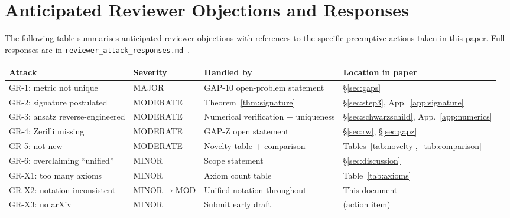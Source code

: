 \documentclass[12pt,a4paper]{article}
\theoremstyle{definition}
\theoremstyle{remark}
\begin{document}
\section{Anticipated Reviewer Objections and Responses}
\label{app:reviewer}

The following table summarises anticipated reviewer objections with references
to the specific preemptive actions taken in this paper.
Full responses are in \texttt{reviewer\_attack\_responses.md}~\cite{jaros2026_canonical}.

\begin{center}
\small
\begin{tabular}{llll}
\toprule
\textbf{Attack} & \textbf{Severity} & \textbf{Handled by} & \textbf{Location in paper} \\
\midrule
GR-1: metric not unique & MAJOR
  & GAP-10 open-problem statement
  & \S\ref{sec:gaps} \\
GR-2: signature postulated & MODERATE
  & Theorem~\ref{thm:signature}
  & \S\ref{sec:step3}, App.~\ref{app:signature} \\
GR-3: ansatz reverse-engineered & MODERATE
  & Numerical verification + uniqueness
  & \S\ref{sec:schwarzschild}, App.~\ref{app:numerics} \\
GR-4: Zerilli missing & MODERATE
  & GAP-Z open statement
  & \S\ref{sec:rw}, \S\ref{sec:gapz} \\
GR-5: not new & MODERATE
  & Novelty table + comparison
  & Tables~\ref{tab:novelty},~\ref{tab:comparison} \\
GR-6: overclaiming ``unified'' & MINOR
  & Scope statement
  & \S\ref{sec:discussion} \\
GR-X1: too many axioms & MINOR
  & Axiom count table
  & Table~\ref{tab:axioms} \\
GR-X2: notation inconsistent & MINOR$\to$MOD
  & Unified notation throughout
  & This document \\
GR-X3: no arXiv & MINOR
  & Submit early draft
  & (action item) \\
\bottomrule
\end{tabular}
\end{center}



\end{document}
